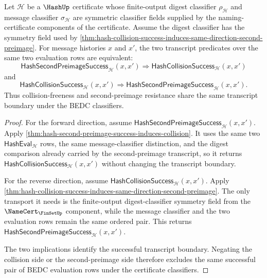 \begin{theorem}
\label{thm:hash-resistance-success-boundary}
Let $\mathcal H$ be a $\HashUp$ certificate whose finite-output digest classifier $\rho_{\mathcal H}$ and message classifier $\sigma_{\mathcal H}$ are symmetric classifier fields supplied by the naming-certificate components of the certificate. Assume the digest classifier has the symmetry field used by \autoref{thm:hash-collision-success-induces-same-direction-second-preimage}. For message histories $x$ and $x'$, the two transcript predicates over the same two evaluation rows are equivalent:
$$
\mathsf{HashSecondPreimageSuccess}_{\mathcal H}(x,x')
\Longrightarrow
\mathsf{HashCollisionSuccess}_{\mathcal H}(x,x')
$$
and
$$
\mathsf{HashCollisionSuccess}_{\mathcal H}(x,x')
\Longrightarrow
\mathsf{HashSecondPreimageSuccess}_{\mathcal H}(x,x').
$$
Thus collision-freeness and second-preimage resistance share the same transcript boundary under the BEDC classifiers.
\end{theorem}
\begin{proof}
For the forward direction, assume $\mathsf{HashSecondPreimageSuccess}_{\mathcal H}(x,x')$. Apply \autoref{thm:hash-second-preimage-success-induces-collision}. It uses the same two $\mathsf{HashEval}_{\mathcal H}$ rows, the same message-classifier distinction, and the digest comparison already carried by the second-preimage transcript, so it returns $\mathsf{HashCollisionSuccess}_{\mathcal H}(x,x')$ without changing the transcript boundary.

For the reverse direction, assume $\mathsf{HashCollisionSuccess}_{\mathcal H}(x,x')$. Apply \autoref{thm:hash-collision-success-induces-same-direction-second-preimage}. The only transport it needs is the finite-output digest-classifier symmetry field from the $\NameCert_{\FinSetUp}$ component, while the message classifier and the two evaluation rows remain the same ordered pair. This returns $\mathsf{HashSecondPreimageSuccess}_{\mathcal H}(x,x')$.

The two implications identify the successful transcript boundary. Negating the collision side or the second-preimage side therefore excludes the same successful pair of BEDC evaluation rows under the certificate classifiers.
\end{proof}

